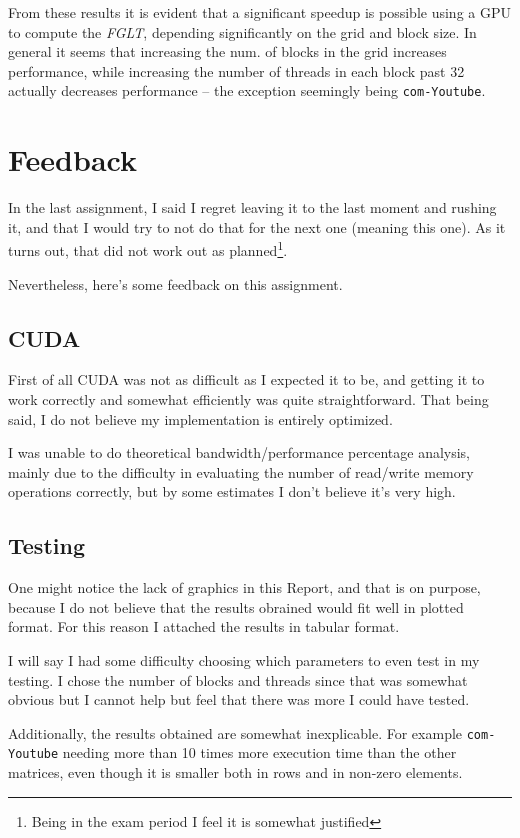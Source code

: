 \documentclass[10pt, a4paper]{article}
\newcommand{\fglt}{\textit{FGLT}}
\begin{document}
From these results it is evident that a significant speedup is possible using a GPU to compute
the \fglt, depending significantly on the grid and block size. In general it seems that increasing the 
num. of blocks in the grid increases performance, while increasing the number of threads in each block
past 32 actually decreases performance -- the exception seemingly being \verb|com-Youtube|.

\section{Feedback}
In the last assignment, I said I regret leaving it to the last moment and rushing it, and that
I would try to not do that for the next one (meaning this one). As it turns out, that did not work
out as planned\footnote{Being in the exam period I feel it is somewhat justified}.

Nevertheless, here's some feedback on this assignment.

\subsection{CUDA}
First of all CUDA was not as difficult as I expected it to be, and getting it to work correctly 
and somewhat efficiently was quite straightforward. That being said, I do not believe my implementation
is entirely optimized. 

I was unable to do theoretical bandwidth/performance percentage analysis, 
mainly due to the difficulty in evaluating the number of read/write memory operations correctly, 
but by some estimates I don't believe it's very high.

\subsection{Testing}
One might notice the lack of graphics in this Report, and that is on purpose, because I do not
believe that the results obrained would fit well in plotted format. For this reason I attached
the results in tabular format.

I will say I had some difficulty choosing which parameters to even test in my testing. I chose the
number of blocks and threads since that was somewhat obvious but I cannot help but feel that there was
more I could have tested. 

Additionally, the results obtained are somewhat inexplicable. For example \verb|com-Youtube| needing 
more than 10 times more execution time than the other matrices, even though it is smaller both in rows
and in non-zero elements.
\end{document}
